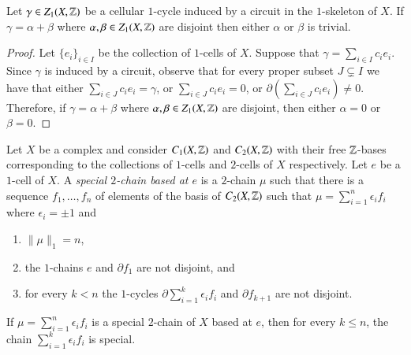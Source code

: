  
\begin{lemma}\label{lem:key-observation}
Let $\gamma \in Z_1(X, \mathbb{Z})$ be a cellular $1$-cycle induced by a circuit in the $1$-skeleton of $X$.
If $\gamma = \alpha+\beta$ where $\alpha, \beta \in Z_1(X, \mathbb{Z})$ are disjoint  then either $\alpha$ or $\beta$ is  trivial.
\end{lemma}
\begin{proof}
Let $\{e_i\}_{i\in I}$ be the collection of $1$-cells of $X$. Suppose that $\gamma = \sum_{i\in I} c_i  e_i$. Since $\gamma$ is induced by a circuit, observe that for every proper subset $J \subsetneq I$ we have that either $\sum_{i\in J} c_i  e_i=\gamma$, or  $\sum_{i\in J} c_i  e_i = 0$, or $\partial \left( \sum_{i\in J} c_i  e_i \right) \neq 0$. Therefore, if $\gamma = \alpha+\beta$ where $\alpha, \beta \in Z_1(X, \mathbb{Z})$ are disjoint, then either $\alpha=0$ or $\beta=0$.
\end{proof}

\begin{definition}
Let $X$ be a complex and consider $C_1(X, \mathbb{Z})$ and $C_2(X, \mathbb{Z})$ with their free $\mathbb{Z}$-bases corresponding to the collections of  $1$-cells and $2$-cells of $X$ respectively.   Let $e$ be a $1$-cell of $X$.  A \emph{special $2$-chain based at $e$} is a $2$-chain $\mu$ such that there is a sequence  $f_1,  \ldots ,   f_n$ of elements of the basis of $C_2(X, \mathbb{Z})$ such that 
 $\mu = \sum_{i =1}^n \epsilon_i  f_i$ where  $\epsilon_i= \pm 1$ and 
\begin{enumerate}
\item $\|\mu\|_{1}=n$,
\item the $1$-chains $e$ and $\partial f_1$ are not disjoint, and 
\item for every $k<n$ the $1$-cycles $\partial \sum_{i=1}^k \epsilon_i f_i$ and $\partial f_{k+1}$ are not disjoint. 
\end{enumerate}
 \end{definition}

\begin{remark}
If  $\mu = \sum_{i =1}^n \epsilon_i  f_i$ is a special $2$-chain of $X$ based at $e$, then for every $k\leq n$, the chain $\sum_{i =1}^k \epsilon_i   f_i$ is special.
\end{remark}

